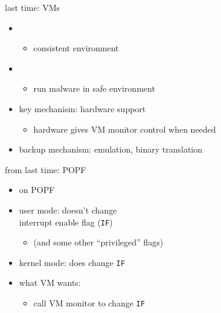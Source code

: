\begin{frame}
    \titlepage
\end{frame}

\begin{frame}{last time: VMs}
    \begin{itemize}
    \item {}
        \begin{itemize}
        \item consistent environment
        \end{itemize}
    \item {}
        \begin{itemize}
        \item run malware in safe environment
        \end{itemize}
    \item key mechanism: hardware support
        \begin{itemize}
        \item hardware gives VM monitor control when needed
        \end{itemize}
    \item backup mechanism: emulation, binary translation
    \end{itemize}
\end{frame}

\begin{frame}{from last time: POPF}
    \begin{itemize}
    \item on POPF
    \vspace{.5cm}
    \item user mode:  doesn't change \\ interrupt enable flag ({\tt IF})
        \begin{itemize}
        \item (and some other ``privileged'' flags)
        \end{itemize}
    \item kernel mode: does change {\tt IF}
    \item what VM wants:
        \begin{itemize}
        \item call VM monitor to change  {\tt IF}
        \end{itemize}
    \end{itemize}
\end{frame}

